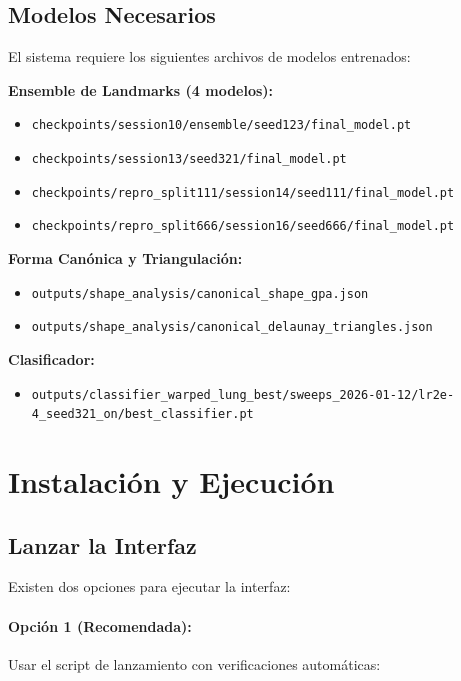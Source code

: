 \subsection{Modelos Necesarios}

El sistema requiere los siguientes archivos de modelos entrenados:

\textbf{Ensemble de Landmarks (4 modelos):}
\begin{itemize}
    \item \texttt{checkpoints/session10/ensemble/seed123/final\_model.pt}
    \item \texttt{checkpoints/session13/seed321/final\_model.pt}
    \item \texttt{checkpoints/repro\_split111/session14/seed111/final\_model.pt}
    \item \texttt{checkpoints/repro\_split666/session16/seed666/final\_model.pt}
\end{itemize}

\textbf{Forma Canónica y Triangulación:}
\begin{itemize}
    \item \texttt{outputs/shape\_analysis/canonical\_shape\_gpa.json}
    \item \texttt{outputs/shape\_analysis/canonical\_delaunay\_triangles.json}
\end{itemize}

\textbf{Clasificador:}
\begin{itemize}
    \item {\small \texttt{outputs/classifier\_warped\_lung\_best/sweeps\_2026-01-12/\linebreak lr2e-4\_seed321\_on/best\_classifier.pt}}
\end{itemize}

\section{Instalación y Ejecución}

\subsection{Lanzar la Interfaz}

Existen dos opciones para ejecutar la interfaz:

\paragraph{Opción 1 (Recomendada):} Usar el script de lanzamiento con verificaciones automáticas:

